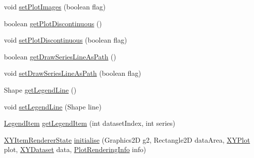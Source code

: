 \begin{DoxyCompactItemize}
\item 
void \mbox{\hyperlink{classorg_1_1jfree_1_1chart_1_1renderer_1_1xy_1_1_standard_x_y_item_renderer_adfb9bbb5844a0cb4b60a51c5b8914a59}{set\+Plot\+Images}} (boolean flag)
\item 
boolean \mbox{\hyperlink{classorg_1_1jfree_1_1chart_1_1renderer_1_1xy_1_1_standard_x_y_item_renderer_a3f656e3c3e9c05dc2ad23141333189b3}{get\+Plot\+Discontinuous}} ()
\item 
void \mbox{\hyperlink{classorg_1_1jfree_1_1chart_1_1renderer_1_1xy_1_1_standard_x_y_item_renderer_a371ceb2d157fea42f1733520b152f228}{set\+Plot\+Discontinuous}} (boolean flag)
\item 
boolean \mbox{\hyperlink{classorg_1_1jfree_1_1chart_1_1renderer_1_1xy_1_1_standard_x_y_item_renderer_adb0d35a07a330dd01f8e391943e97fef}{get\+Draw\+Series\+Line\+As\+Path}} ()
\item 
void \mbox{\hyperlink{classorg_1_1jfree_1_1chart_1_1renderer_1_1xy_1_1_standard_x_y_item_renderer_a393bcfda70344fea7d35155ae9546d4b}{set\+Draw\+Series\+Line\+As\+Path}} (boolean flag)
\item 
Shape \mbox{\hyperlink{classorg_1_1jfree_1_1chart_1_1renderer_1_1xy_1_1_standard_x_y_item_renderer_aa439ec3ea74bfa0ebaa36d25d5eaae06}{get\+Legend\+Line}} ()
\item 
void \mbox{\hyperlink{classorg_1_1jfree_1_1chart_1_1renderer_1_1xy_1_1_standard_x_y_item_renderer_a68dbfee7530d78e8cb70916b5b566bf0}{set\+Legend\+Line}} (Shape line)
\item 
\mbox{\hyperlink{classorg_1_1jfree_1_1chart_1_1_legend_item}{Legend\+Item}} \mbox{\hyperlink{classorg_1_1jfree_1_1chart_1_1renderer_1_1xy_1_1_standard_x_y_item_renderer_a13ddb95fcb4139f2e760f5f73d5ddcbf}{get\+Legend\+Item}} (int dataset\+Index, int series)
\item 
\mbox{\hyperlink{classorg_1_1jfree_1_1chart_1_1renderer_1_1xy_1_1_x_y_item_renderer_state}{X\+Y\+Item\+Renderer\+State}} \mbox{\hyperlink{classorg_1_1jfree_1_1chart_1_1renderer_1_1xy_1_1_standard_x_y_item_renderer_a75a53905e19f2319e692b08b43665e30}{initialise}} (Graphics2D g2, Rectangle2D data\+Area, \mbox{\hyperlink{classorg_1_1jfree_1_1chart_1_1plot_1_1_x_y_plot}{X\+Y\+Plot}} plot, \mbox{\hyperlink{interfaceorg_1_1jfree_1_1data_1_1xy_1_1_x_y_dataset}{X\+Y\+Dataset}} data, \mbox{\hyperlink{classorg_1_1jfree_1_1chart_1_1plot_1_1_plot_rendering_info}{Plot\+Rendering\+Info}} info)
\item 

\end{DoxyCompactItemize}
